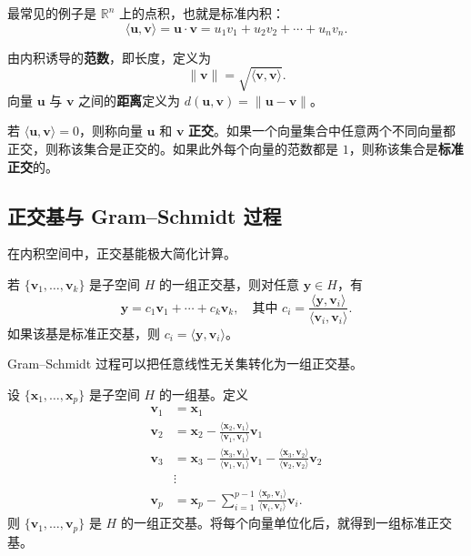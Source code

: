 最常见的例子是 $\mathbb{R}^n$ 上的点积，也就是标准内积：
\[
\langle\mathbf{u},\mathbf{v}\rangle=\mathbf{u}\cdot\mathbf{v}=u_1v_1+u_2v_2+\cdots+u_nv_n.
\]

\begin{definition}[范数与距离]
由内积诱导的\textbf{范数}，即长度，定义为
\[
\|\mathbf{v}\|=\sqrt{\langle\mathbf{v},\mathbf{v}\rangle}.
\]
向量 $\mathbf{u}$ 与 $\mathbf{v}$ 之间的\textbf{距离}定义为 $d(\mathbf{u},\mathbf{v})=\|\mathbf{u}-\mathbf{v}\|$。
\end{definition}

\begin{definition}[正交性]
若 $\langle\mathbf{u},\mathbf{v}\rangle=0$，则称向量 $\mathbf{u}$ 和 $\mathbf{v}$ \textbf{正交}。如果一个向量集合中任意两个不同向量都正交，则称该集合是正交的。如果此外每个向量的范数都是 $1$，则称该集合是\textbf{标准正交}的。
\end{definition}

\subsection{正交基与 Gram--Schmidt 过程}

在内积空间中，正交基能极大简化计算。

\begin{theorem}
若 $\{\mathbf{v}_1,\ldots,\mathbf{v}_k\}$ 是子空间 $H$ 的一组正交基，则对任意 $\mathbf{y}\in H$，有
\[
\mathbf{y}=c_1\mathbf{v}_1+\cdots+c_k\mathbf{v}_k,\quad \text{其中 } c_i=\frac{\langle\mathbf{y},\mathbf{v}_i\rangle}{\langle\mathbf{v}_i,\mathbf{v}_i\rangle}.
\]
如果该基是标准正交基，则 $c_i=\langle\mathbf{y},\mathbf{v}_i\rangle$。
\end{theorem}

Gram--Schmidt 过程可以把任意线性无关集转化为一组正交基。

\begin{theorem}
设 $\{\mathbf{x}_1,\ldots,\mathbf{x}_p\}$ 是子空间 $H$ 的一组基。定义
\begin{align*}
\mathbf{v}_1 &= \mathbf{x}_1 \\
\mathbf{v}_2 &= \mathbf{x}_2 - \frac{\langle \mathbf{x}_2, \mathbf{v}_1 \rangle}{\langle \mathbf{v}_1, \mathbf{v}_1 \rangle} \mathbf{v}_1 \\
\mathbf{v}_3 &= \mathbf{x}_3 - \frac{\langle \mathbf{x}_3, \mathbf{v}_1 \rangle}{\langle \mathbf{v}_1, \mathbf{v}_1 \rangle} \mathbf{v}_1 - \frac{\langle \mathbf{x}_3, \mathbf{v}_2 \rangle}{\langle \mathbf{v}_2, \mathbf{v}_2 \rangle} \mathbf{v}_2 \\
&\vdots \\
\mathbf{v}_p &= \mathbf{x}_p - \sum_{i=1}^{p-1} \frac{\langle \mathbf{x}_p, \mathbf{v}_i \rangle}{\langle \mathbf{v}_i, \mathbf{v}_i \rangle} \mathbf{v}_i.
\end{align*}
则 $\{\mathbf{v}_1,\ldots,\mathbf{v}_p\}$ 是 $H$ 的一组正交基。将每个向量单位化后，就得到一组标准正交基。
\end{theorem}

